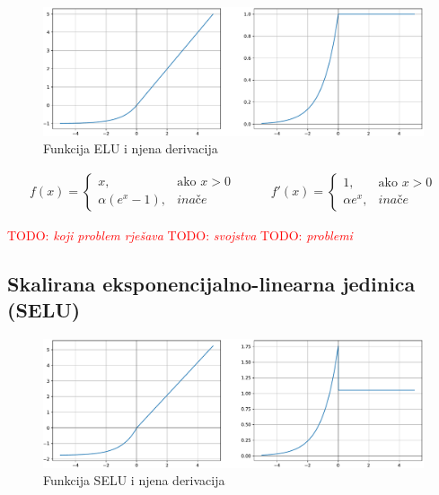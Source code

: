 \documentclass[times, utf8, numeric, diplomski]{fer}
\def\otherwise{\textit{inače}}
\def\TODO#1{\noindent\textcolor{red}{TODO: \textit{#1}}\newline}
\def\todo#1{\TODO{#1}}
\begin{document}
\begin{figure}[H]
\includegraphics[width=\textwidth]{ELU.pdf}
\centering
\caption{Funkcija ELU i njena derivacija}
\label{fig:elu}
\end{figure}

\begin{equation}
\label{eq:elu}
\begin{split}
f(x) = 
\begin{cases}
x,					& \text{ako } x > 0 \\
\alpha (e^x - 1),	& \otherwise
\end{cases}
\end{split}
\qquad
\begin{split}
f'(x) = 
\begin{cases}
1,	 		& \text{ako } x > 0 \\
\alpha e^x,	& \otherwise
\end{cases}
\end{split}
\end{equation}

\todo{koji problem rješava}
\todo{svojstva}
\todo{problemi}

\subsection{Skalirana eksponencijalno-linearna jedinica (SELU)}

\begin{figure}[H]
\includegraphics[width=\textwidth]{SELU.pdf}
\centering
\caption{Funkcija SELU i njena derivacija}
\label{fig:selu}
\end{figure}
\end{document}
